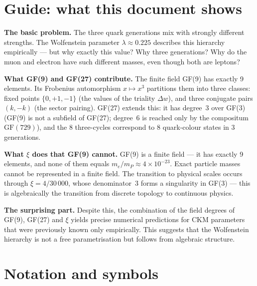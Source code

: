 \section*{Guide: what this document shows}

\textbf{The basic problem.}
The three quark generations mix with strongly different strengths.
The Wolfenstein parameter $\lambda\approx 0.225$ describes this hierarchy
empirically — but why exactly this value? Why three generations?
Why do the muon and electron have such different masses, even though
both are leptons?

\textbf{What GF(9) and GF(27) contribute.}
The finite field GF(9) has exactly 9 elements. Its Frobenius automorphism
$x\mapsto x^3$ partitions them into three classes: fixed points $\{0,+1,-1\}$
(the values of the triality $\Delta w$), and three conjugate pairs $(k,-k)$ (the sector pairing).
GF(27) extends this: it has degree~3 over GF(3) (GF(9) is not a subfield
of GF(27); degree~6 is reached only by the compositum $\mathrm{GF}(729)$),
and the 8 three-cycles correspond to 8 quark-colour states in
3 generations.

\textbf{What $\xi$ does that GF(9) cannot.}
GF(9) is a finite field — it has exactly 9 elements,
and none of them equals $m_e/m_P \approx 4\times 10^{-23}$.
Exact particle masses cannot be represented in a finite field.
The transition to physical scales occurs through $\xi = 4/30\,000$,
whose denominator~3 forms a singularity in GF(3) — this is algebraically
the transition from discrete topology to continuous physics.

\textbf{The surprising part.}
Despite this, the combination of the field degrees of GF(9), GF(27) and $\xi$ yields precise
numerical predictions for CKM parameters that were previously known only
empirically. This suggests that the Wolfenstein hierarchy is not a free
parametrisation but follows from algebraic structure.

\section*{Notation and symbols}


